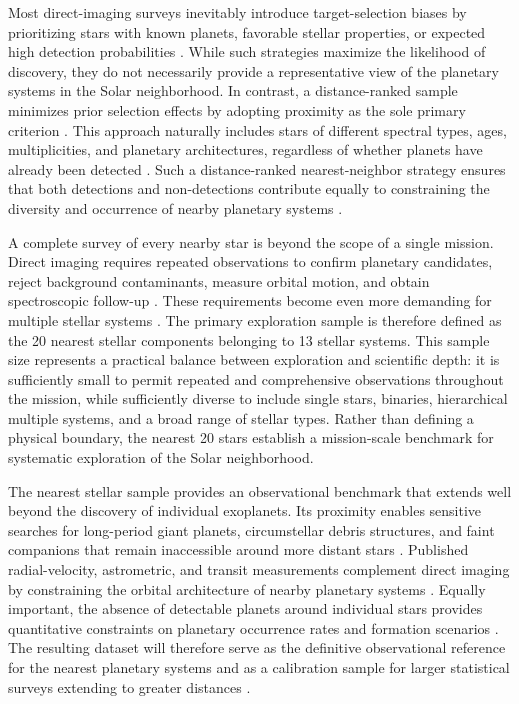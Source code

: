 Most direct-imaging surveys inevitably introduce target-selection biases by prioritizing stars with known planets, favorable stellar properties, or expected high detection probabilities \cite{Nielsen2019}. 
While such strategies maximize the likelihood of discovery, they do not necessarily provide a representative view of the planetary systems in the Solar neighborhood. In contrast, a distance-ranked sample minimizes prior selection effects by adopting proximity as the sole primary criterion \cite{Henry2018}. 
This approach naturally includes stars of different spectral types, ages, multiplicities, and planetary architectures, regardless of whether planets have already been detected \cite{Henry2018}. 
Such a distance-ranked nearest-neighbor strategy ensures that both detections and non-detections contribute equally to constraining the diversity and occurrence of nearby planetary systems \cite{Bowler2016}.

A complete survey of every nearby star is beyond the scope of a single mission. Direct imaging requires repeated observations to confirm planetary candidates, reject background contaminants, measure orbital motion, and obtain spectroscopic follow-up \cite{Currie2022}. 
These requirements become even more demanding for multiple stellar systems \cite{HabEx2020}. 
The primary exploration sample is therefore defined as the 20 nearest stellar components belonging to 13 stellar systems. This sample size represents a practical
balance between exploration and scientific depth: it is sufficiently small to permit repeated and comprehensive observations throughout the mission, while sufficiently diverse to include single stars, binaries, hierarchical multiple systems, and a broad range of stellar types. Rather than defining a physical boundary, the nearest 20 stars establish a mission-scale benchmark for systematic exploration of the Solar neighborhood.

The nearest stellar sample provides an observational benchmark that extends well beyond the discovery of individual exoplanets. Its proximity enables sensitive searches for long-period giant planets, circumstellar debris structures, and faint companions that remain inaccessible around more distant stars \cite{Bowler2016}. 
Published radial-velocity, astrometric, and transit measurements complement
direct imaging by constraining the orbital architecture of nearby planetary
systems \cite{LUVOIR2019}.
Equally important, the absence of detectable planets around individual stars provides quantitative constraints on planetary occurrence rates and formation scenarios 
\cite{Bowler2016}. 
The resulting dataset will therefore serve as the definitive observational reference for the nearest planetary systems and as a calibration sample for larger statistical surveys extending to greater distances \cite{LUVOIR2019}.

